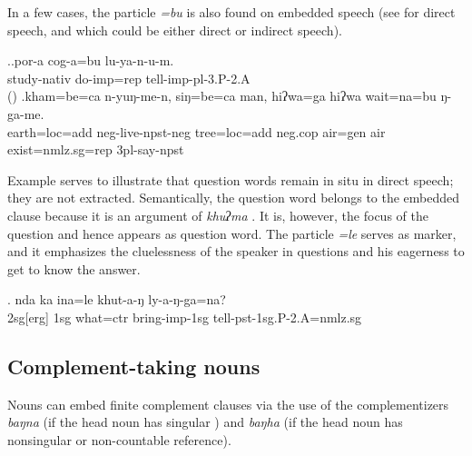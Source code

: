 In a few cases, the  particle \emph{=bu} is also found on embedded speech (see \Next[a] for direct speech, and \Next[b] which could be either direct or indirect speech). 

\ex.\ag.por-a        cog-a=bu         lu-ya-n-u-m.\\
study{\sc -nativ} do{\sc -imp=rep} tell{\sc -imp-pl-3.P-2.A}\\
 () 
\bg.kham=be=ca   n-yuŋ-me-n,  siŋ=be=ca   man,     hiʔwa=ga    hiʔwa wait=na=bu    ŋ-ga-me.\\
earth{\sc =loc=add} {\sc neg-}live{\sc [3sg]-npst-neg} tree{\sc =loc=add} {\sc neg.cop} air{\sc =gen} air exist{\sc [npst;3]=nmlz.sg=rep} {\sc 3pl-}say{\sc -npst}\\


Example \Next serves to illustrate that question words remain in situ in direct speech; they are not extracted. Semantically, the question word belongs to the embedded clause because it is an argument of \emph{khuʔma} . It is, however, the focus of the question and hence appears as question word. The particle \emph{=le} serves as  marker, and it emphasizes the cluelessness of the speaker  in questions and his eagerness to get to know the answer.

\exg. nda ka ina=le khut-a-ŋ ly-a-ŋ-ga=na?\\
		{\sc 2sg[erg]} {\sc 1sg} what{\sc =ctr}	bring{\sc -imp-1sg} tell{\sc -pst-1sg.P-2.A=nmlz.sg}\\







\subsection{Complement-taking nouns}\label{noun-compl}

Nouns can embed finite complement clauses via the use of the complementizers \emph{baŋna} (if the head noun has singular ) and \emph{baŋha} (if the head noun has nonsingular  or non-countable reference). 

